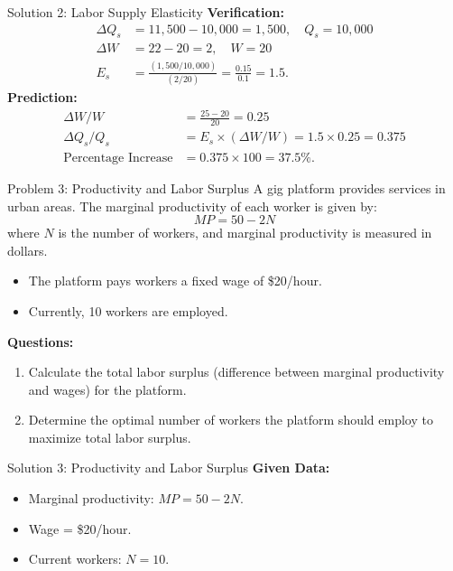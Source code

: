 \documentclass{beamer}
\begin{document}
\begin{frame}{Solution 2: Labor Supply Elasticity}
    \textbf{Verification:}
    \begin{align*}
        \Delta Q_s &= 11,500 - 10,000 = 1,500, \quad Q_s = 10,000 \\
        \Delta W &= 22 - 20 = 2, \quad W = 20 \\
        E_s &= \frac{(1,500 / 10,000)}{(2 / 20)} = \frac{0.15}{0.1} = 1.5.
    \end{align*}
    \textbf{Prediction:}
    \begin{align*}
        \Delta W / W &= \frac{25 - 20}{20} = 0.25 \\
        \Delta Q_s / Q_s &= E_s \times (\Delta W / W) = 1.5 \times 0.25 = 0.375 \\
        \text{Percentage Increase} &= 0.375 \times 100 = 37.5\%.
    \end{align*}
\end{frame}


\begin{frame}{Problem 3: Productivity and Labor Surplus}
    A gig platform provides services in urban areas. The marginal productivity of each worker is given by:
    \[ MP = 50 - 2N \]
    where \(N\) is the number of workers, and marginal productivity is measured in dollars.
    \begin{itemize}
        \item The platform pays workers a fixed wage of \$20/hour.
        \item Currently, 10 workers are employed.
    \end{itemize}
    \textbf{Questions:}
    \begin{enumerate}
        \item Calculate the total labor surplus (difference between marginal productivity and wages) for the platform.
        \item Determine the optimal number of workers the platform should employ to maximize total labor surplus.
    \end{enumerate}
\end{frame}

\begin{frame}{Solution 3: Productivity and Labor Surplus}
    \textbf{Given Data:}
    \begin{itemize}
        \item Marginal productivity: \( MP = 50 - 2N \).
        \item Wage = \$20/hour.
        \item Current workers: \( N = 10 \).
    \end{itemize}

\end{frame}
\end{document}
